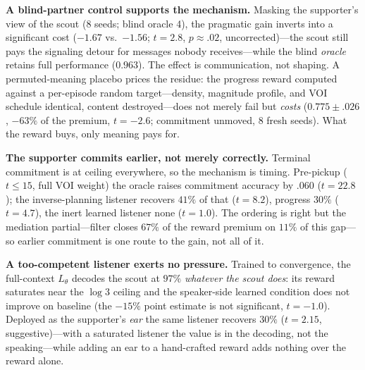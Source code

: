 \documentclass[sigconf,review,anonymous]{acmart}
\newcommand{\Ltheta}{L_\theta}
\begin{document}
\textbf{A blind-partner control supports the mechanism.} Masking the supporter's view of the scout (8 seeds; blind oracle 4), the pragmatic gain inverts into a significant cost ($-1.67$ vs.\ $-1.56$; $t=2.8$, $p\approx.02$, uncorrected)---the scout still pays the signaling detour for messages nobody receives---while the blind \emph{oracle} retains full performance ($0.963$). The effect is communication, not shaping. A permuted-meaning placebo prices the residue: the progress reward computed against a per-episode random target---density, magnitude profile, and VOI schedule identical, content destroyed---does not merely fail but \emph{costs} ($0.775\pm.026$, $-63\%$ of the premium, $t{=}{-}2.6$; commitment unmoved, 8 fresh seeds). What the reward buys, only meaning pays for.

\textbf{The supporter commits earlier, not merely correctly.} Terminal commitment is at ceiling everywhere, so the mechanism is timing. Pre-pickup ($t\le15$, full VOI weight) the oracle raises commitment accuracy by $.060$ ($t{=}22.8$); the inverse-planning listener recovers $41\%$ of that ($t{=}8.2$), progress $30\%$ ($t{=}4.7$), the inert learned listener none ($t{=}1.0$). The ordering is right but the mediation partial---filter closes $67\%$ of the reward premium on $11\%$ of this gap---so earlier commitment is one route to the gain, not all of it.

\textbf{A too-competent listener exerts no pressure.} Trained to convergence, the full-context $\Ltheta$ decodes the scout at $97\%$ \emph{whatever the scout does}: its reward saturates near the $\log 3$ ceiling and the speaker-side learned condition does not improve on baseline (the $-15\%$ point estimate is not significant, $t{=}{-}1.0$). Deployed as the supporter's \emph{ear} the same listener recovers $30\%$ ($t=2.15$, suggestive)---with a saturated listener the value is in the decoding, not the speaking---while adding an ear to a hand-crafted reward adds nothing over the reward alone.
\end{document}
